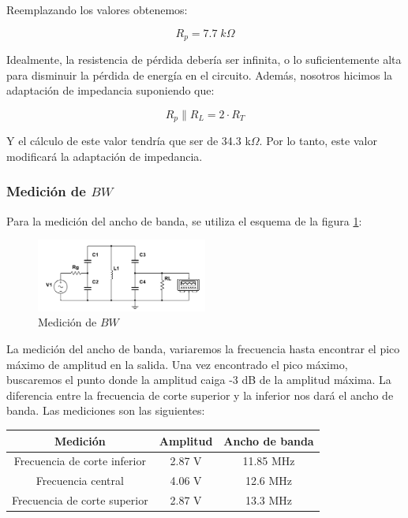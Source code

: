 Reemplazando los valores obtenemos:

\begin{equation}
    \boxed{R_p = 7.7\; k\Omega}
\end{equation}

Idealmente, la resistencia de pérdida debería ser infinita, o lo suficientemente alta para disminuir la pérdida de energía en el circuito. Además, nosotros hicimos la adaptación
de impedancia suponiendo que:

\begin{equation}
    R_p \parallel R_L = 2 \cdot R_T
\end{equation}

Y el cálculo de este valor tendría que ser de 34.3 k$\Omega$. Por lo tanto, este valor modificará la adaptación de impedancia. 

\subsubsection{Medición de $BW$}

Para la medición del ancho de banda, se utiliza el esquema de la figura \ref{fig: de la medición del ancho de banda}:

\begin{figure}[h]
    \centering
    \includegraphics[width=0.5\textwidth]{Imagenes/medicion_bw.png}
    \caption{Medición de $BW$}
    \label{fig: de la medición del ancho de banda}
\end{figure}

La medición del ancho de banda, variaremos la frecuencia hasta encontrar el pico máximo de amplitud en la salida. Una vez encontrado
el pico máximo, buscaremos el punto donde la amplitud caiga -3 dB de la amplitud máxima. La diferencia entre la frecuencia de corte superior y la inferior nos dará el ancho de banda. 
Las mediciones son las siguientes:

\begin{table}[h]
    \centering
    \begin{tabular}{|c|c|c|}
    \hline
    \rowcolor[HTML]{C0C0C0} 
    \textbf{Medición} & \textbf{Amplitud} & \textbf{Ancho de banda} \\ \hline
    Frecuencia de corte inferior            & 2.87 V             & 11.85 MHz                \\ \hline
    Frecuencia central         & 4.06 V             & 12.6 MHz                \\ \hline
    Frecuencia de corte superior            & 2.87 V             & 13.3 MHz                \\ \hline
    \end{tabular}
\end{table}

